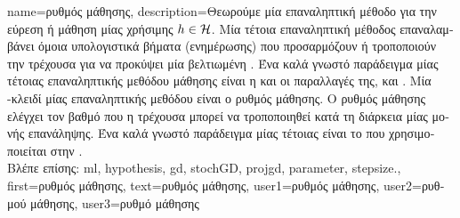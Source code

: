 {name={\foreignlanguage{greek}{ρυθμός μάθησης}}, 
	description={\foreignlanguage{greek}{Θεωρούμε μία επαναληπτική μέθοδο} 
		 \foreignlanguage{greek}{για την εύρεση ή μάθηση μίας χρήσιμης}  $h \in \mathcal{H}$. 
		\foreignlanguage{greek}{Μία τέτοια επαναληπτική μέθοδος επαναλαμβάνει όμοια υπολογιστικά βήματα (ενημέρωσης) που  
		προσαρμόζουν ή τροποποιούν την τρέχουσα}  \foreignlanguage{greek}{για να προκύψει μία βελτιωμένη} 
		. \foreignlanguage{greek}{Ένα καλά γνωστό παράδειγμα μίας τέτοιας επαναληπτικής μεθόδου μάθησης είναι η}  
		 \foreignlanguage{greek}{και οι παραλλαγές της,}  \foreignlanguage{greek}{και}  
		. \foreignlanguage{greek}{Μία} -\foreignlanguage{greek}{κλειδί μίας επαναληπτικής μεθόδου 
		είναι ο ρυθμός μάθησης. Ο ρυθμός μάθησης ελέγχει τον βαθμό που η τρέχουσα}  \foreignlanguage{greek}{μπορεί να 
		τροποποιηθεί κατά τη διάρκεια μίας μονής επανάληψης. Ένα καλά γνωστό παράδειγμα μίας τέτοιας}  \foreignlanguage{greek}{είναι 
		το}  \foreignlanguage{greek}{που χρησιμοποιείται στην}  \cite[\foreignlanguage{greek}{Κεφ.} 5]{MLBasics}.\\
		\foreignlanguage{greek}{Βλέπε επίσης:} \gls{ml}, \gls{hypothesis}, \gls{gd}, \gls{stochGD}, \gls{projgd}, \gls{parameter}, \gls{stepsize}.},
	first={\foreignlanguage{greek}{ρυθμός μάθησης}},
	text={\foreignlanguage{greek}{ρυθμός μάθησης}},
	user1={\foreignlanguage{greek}{ρυθμός μάθησης}}, %
  	user2={\foreignlanguage{greek}{ρυθμού μάθησης}}, %
	user3={\foreignlanguage{greek}{ρυθμό μάθησης}} %
}

